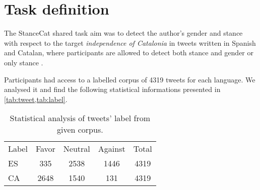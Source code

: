 \section{Task definition} \label{sec:task}

The StanceCat shared task aim was to detect the author's gender and stance with respect to the target \emph{independence of Catalonia} in tweets written in Spanish and Catalan, where participants are allowed to detect both stance and gender or only stance \cite{taule2017overview}.

Participants had access to a labelled corpus of 4319 tweets for each language. We analysed it and find the following statistical informations presented in \cref{tab:tweet,tab:label}.

\begin{comment}


\begin{table}[h]
\footnotesize
\centering
\begin{tabular}{l|cccc}
\toprule
\hline
Label		& Favor		& Neutral		& Against	& Total		\\
\hline
ES			& 335		& 2538			& 1446		& 4319		\\
CA			& 2648		& 1540			& 131		& 4319		\\
\hline
\bottomrule
\end{tabular}
\caption{Statistical analysis of tweets' label from given corpus.}
\label{tab:labelold}
\end{table}

\begin{table}[h]
\footnotesize
\centering
\begin{tabular}{l|ccc}
\toprule
\hline
Tweets		& Average		& Deviation		& Max		\\
\hline
ES			& 14			& 3				& 23		\\ 
CA			& 13			& 4				& 20		\\ 
\hline
\bottomrule
\end{tabular}
\caption{Statistical analysis of given corpus' tweets regarding words length.}
\label{tab:tweetold}
\end{table}

\end{comment}

\begin{table}[h]
	\centering
	\caption{Statistical analysis of tweets' label from given corpus.}
	\label{tab:label}
	\begin{tabular}{l|cccc}
		\hline\noalign{\smallskip}
		Label		& Favor		& Neutral		& Against	& Total		\\
		\noalign{\smallskip}
		\hline
		\noalign{\smallskip}
		ES			& 335		& 2538			& 1446		& 4319		\\
		CA			& 2648		& 1540			& 131		& 4319		\\
		\hline
	\end{tabular}
\end{table}


